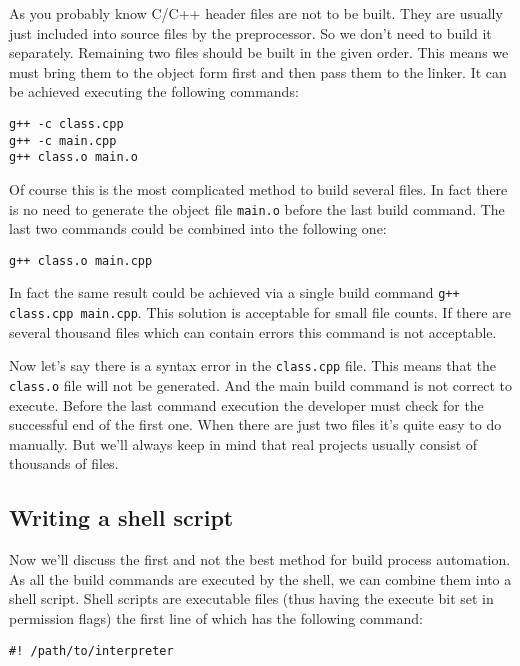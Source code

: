 As you probably know C/C++ header files are not to be built. They are usually just included into source files by the preprocessor. So we don't need to build it separately. Remaining two files should be built in the given order. This means we must bring them to the object form first and then pass them to the linker. It can be achieved executing the following commands:

\begin{lstlisting}[numbers=none]
g++ -c class.cpp 
g++ -c main.cpp  
g++ class.o main.o
\end{lstlisting}

Of course this is the most complicated method to build several files. In fact there is no need to generate the object file {\tt main.o} before the last build command. The last two commands could be combined into the following one:

\begin{lstlisting}[numbers=none]
g++ class.o main.cpp
\end{lstlisting}

{\remark In fact the same result could be achieved via a single build command {\tt g++ class.cpp main.cpp}. This solution is acceptable for small file counts. If there are several thousand files which can contain errors this command is not acceptable.}

Now let's say there is a syntax error in the {\tt class.cpp} file. This means that the {\tt class.o} file will not be generated. And the main build command is not correct to execute. Before the last command execution the developer must check for the successful end of the first one. When there are just two files it's quite easy to do manually. But we'll always keep in mind that real projects usually consist of thousands of files.

\subsection{Writing a shell script}
Now we'll discuss the first and not the best method for build process automation. As all the build commands are executed by the shell, we can combine them into a shell script. Shell scripts are executable files (thus having the execute bit set in permission flags) the first line of which has the following command:

\begin{lstlisting}[numbers=none]
#! /path/to/interpreter
\end{lstlisting}

